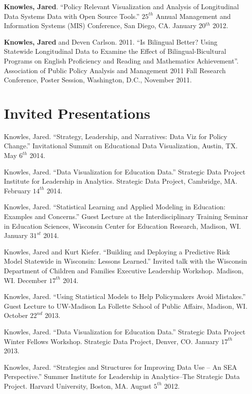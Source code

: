 \documentclass[margin,line]{res}
\begin{document}
\begin{resume}
\textbf{Knowles, Jared}. ``Policy Relevant Visualization and Analysis of Longitudinal Data Systems Data with Open Source Tools.'' $25^{th}$ Annual Management and Information Systems (MIS) Conference, San Diego, CA. January 20$^{th}$ 2012.

\textbf{Knowles, Jared} and Deven Carlson. 2011. ``Is Bilingual Better? Using Statewide Longitudinal Data to Examine the Effect of Bilingual-Bicultural Programs on English Proficiency and Reading and Mathematics Achievement''. Association of Public Policy Analysis and Management 2011 Fall Research Conference, Poster Session, Washington, D.C., November 2011.

\section{\sc Invited Presentations}

Knowles, Jared. ``Strategy, Leadership, and Narratives: Data Viz for Policy Change.'' Invitational Summit on Educational Data Visualization, Austin, TX. May $6^{th}$ 2014. 

Knowles, Jared. ``Data Visualization for Education Data.'' Strategic Data Project Institute for Leadership in Analytics. Strategic Data Project, Cambridge, MA. February $14^{th}$ 2014. 

Knowles, Jared. ``Statistical Learning and Applied Modeling in Education: Examples 
and Concerns.'' Guest Lecture at the Interdisciplinary Training Seminar in Education Sciences, Wisconsin Center for Education Research, Madison, WI. January $31^{st}$ 2014.

Knowles, Jared and Kurt Kiefer. ``Building and Deploying a Predictive Risk Model Statewide in Wisconsin: Lessons Learned.'' Invited talk with the 
Wisconsin Department of Children and Families Executive Leadership Workshop. Madison, WI. December $17^{th}$ 2014.

Knowles, Jared. ``Using Statistical Models to Help Policymakers Avoid Mistakes.'' Guest Lecture to UW-Madison La Follette School of Public Affairs, Madison, WI. October $22^{nd}$ 2013.

Knowles, Jared. ``Data Visualization for Education Data.'' Strategic Data Project Winter Fellows Workshop. Strategic Data Project, Denver, CO. January $17^{th}$ 2013. 

Knowles, Jared. ``Strategies and Structures for Improving Data Use -- An SEA Perspective.'' Summer Institute for Leadership in Analytics--The Strategic Data Project. Harvard University, Boston, MA. August $5^{th}$ 2012. 


\end{resume}
\end{document}
